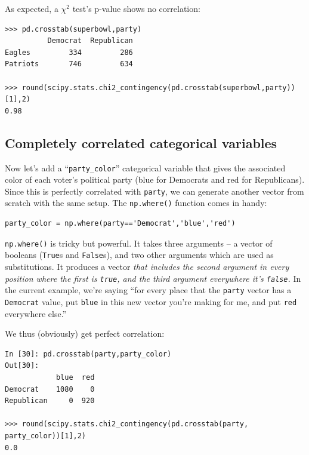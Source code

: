 As expected, a $\chi^2$ test's p-value shows no correlation:

\begin{Verbatim}[fontsize=\footnotesize,samepage=true]
>>> pd.crosstab(superbowl,party)
          Democrat  Republican
Eagles         334         286
Patriots       746         634

>>> round(scipy.stats.chi2_contingency(pd.crosstab(superbowl,party))[1],2)
0.98
\end{Verbatim}

\subsection{Completely correlated categorical variables}

Now let's add a ``\texttt{party\_color}'' categorical variable that gives the
associated color of each voter's political party (blue for Democrats and red
for Republicans). Since this is perfectly correlated with \texttt{party}, we
can generate another vector from scratch with the same setup. The
\texttt{np.where()} function comes in handy:

\begin{Verbatim}[fontsize=\footnotesize,samepage=true]
party_color = np.where(party=='Democrat','blue','red')
\end{Verbatim}

\texttt{np.where()} is tricky but powerful. It takes three arguments -- a
vector of booleans (\texttt{True}s and \texttt{False}s), and two other
arguments which are used as substitutions. It produces a vector \textit{that
includes the second argument in every position where the first is
\texttt{true}, and the third argument everywhere it's \texttt{false}.} In the
current example, we're saying ``for every place that the \texttt{party} vector
has a \texttt{\textquotesingle Democrat\textquotesingle } value, put
\texttt{\textquotesingle blue\textquotesingle } in this new vector you're
making for me, and put \texttt{\textquotesingle red\textquotesingle }
everywhere else.''

We thus (obviously) get perfect correlation:

\begin{Verbatim}[fontsize=\footnotesize,samepage=true]
In [30]: pd.crosstab(party,party_color)
Out[30]: 
            blue  red
Democrat    1080    0
Republican     0  920

>>> round(scipy.stats.chi2_contingency(pd.crosstab(party, party_color))[1],2)
0.0
\end{Verbatim}

